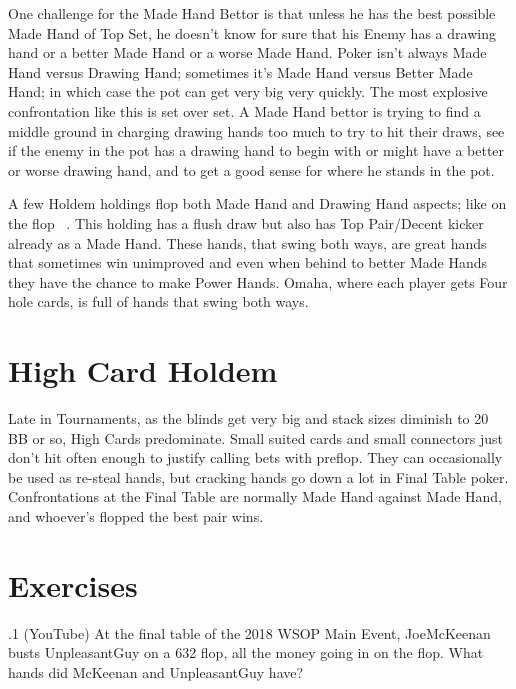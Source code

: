 One challenge for the Made Hand Bettor is that unless he has the best
possible Made Hand of Top Set, he doesn't know for sure that his
Enemy has a drawing hand or a better Made Hand or a worse Made
Hand. Poker isn't always Made Hand versus Drawing Hand; sometimes it's
Made Hand versus Better Made Hand; in which case the pot can get very
big very quickly. The most explosive confrontation like this is set
over set. A Made Hand bettor is trying to find a middle ground in
charging drawing hands too much to try to hit their draws, see if the
enemy in the pot has a drawing hand to begin with or might have a
better or worse drawing hand, and to get a good sense for where he
stands in the pot.

A few Holdem holdings flop both Made Hand and Drawing Hand aspects;
like \Kh\Th on the flop \Kc\nineh\eigh\ . This holding has a flush
draw but also has Top Pair/Decent kicker already as a Made Hand. These
hands, that swing both ways, are great hands that sometimes win
unimproved and even when behind to better Made Hands they have the
chance to make Power Hands. Omaha, where each player gets Four hole
cards, is full of hands that swing both ways.

\section{High Card Holdem}

Late in Tournaments, as the blinds get very big and stack sizes diminish
to 20 BB or so, High Cards predominate. Small suited cards and small
connectors just don't hit often enough to justify calling bets with
preflop. They can occasionally be used as re-steal hands, but cracking
hands go down a lot in Final Table poker. Confrontations at the Final
Table are normally Made Hand against Made Hand, and whoever's flopped
the best pair wins.

\section{Exercises}


.1 (YouTube) At the final table of the 2018 WSOP Main
Event, JoeMcKeenan busts UnpleasantGuy on a 632 flop, all the money
going in on the flop. What hands did McKeenan and UnpleasantGuy have?
